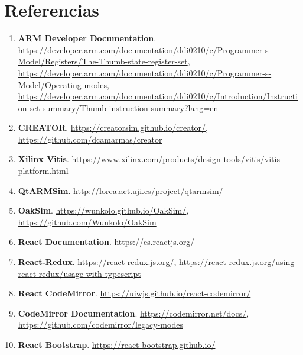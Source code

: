 \newpage
\section{Referencias}
{
    \begin{enumerate}
        \item \textbf{ARM Developer Documentation}.
            \href{https://developer.arm.com/documentation/ddi0210/c/Programmer-s-Model/Registers/The-Thumb-state-register-set}{https://developer.arm.com/documentation/ddi0210/c/Programmer-s-Model/Registers/The-Thumb-state-register-set}, 
            \href{https://developer.arm.com/documentation/ddi0210/c/Programmer-s-Model/Operating-modes}{https://developer.arm.com/documentation/ddi0210/c/Programmer-s-Model/Operating-modes},
            \href{https://developer.arm.com/documentation/ddi0210/c/Introduction/Instruction-set-summary/Thumb-instruction-summary?lang=en}{https://developer.arm.com/documentation/ddi0210/c/Introduction/Instruction-set-summary/Thumb-instruction-summary?lang=en}
        \item \textbf{CREATOR}.
            \href{https://creatorsim.github.io/creator/}{https://creatorsim.github.io/creator/},
            \href{https://github.com/dcamarmas/creator}{https://github.com/dcamarmas/creator}
        \item \textbf{Xilinx Vitis}.
            \href{https://www.xilinx.com/products/design-tools/vitis/vitis-platform.html}{https://www.xilinx.com/products/design-tools/vitis/vitis-platform.html}
        \item \textbf{QtARMSim}.
            \href{http://lorca.act.uji.es/project/qtarmsim/}{http://lorca.act.uji.es/project/qtarmsim/}
        \item \textbf{OakSim}.
            \href{https://wunkolo.github.io/OakSim/}{https://wunkolo.github.io/OakSim/},
            \href{https://github.com/Wunkolo/OakSim}{https://github.com/Wunkolo/OakSim}
        \item \textbf{React Documentation}.
            \href{https://es.reactjs.org/}{https://es.reactjs.org/}
        \item \textbf{React-Redux}.
            \href{https://react-redux.js.org/}{https://react-redux.js.org/},
            \href{https://react-redux.js.org/using-react-redux/usage-with-typescript}{https://react-redux.js.org/using-react-redux/usage-with-typescript}
        \item \textbf{React CodeMirror}.
            \href{https://uiwjs.github.io/react-codemirror/}{https://uiwjs.github.io/react-codemirror/}
        \item \textbf{CodeMirror Documentation}.
            \href{https://codemirror.net/docs/}{https://codemirror.net/docs/},
            \href{https://github.com/codemirror/legacy-modes}{https://github.com/codemirror/legacy-modes}
        \item \textbf{React Bootstrap}.
            \href{https://react-bootstrap.github.io/}{https://react-bootstrap.github.io/}
    \end{enumerate}
}

\newpage

\appendix
\addappheadtotoc




